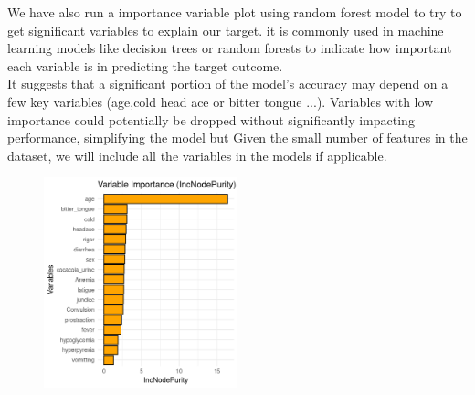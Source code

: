 \documentclass[12pt,a4paper]{article}
\begin{document}
We have also run a importance variable plot using random forest model to try to get significant variables to explain our target. it is commonly used in machine learning models like decision trees or random forests to indicate how important each variable is in predicting the target outcome.\\
It suggests that a significant portion of the model's accuracy may depend on a few key variables (age,cold head ace or bitter tongue ...). Variables with low importance could potentially be dropped without significantly impacting performance, simplifying the model but Given the small number of features in the dataset, we will include all the
variables in the models if applicable.
\begin{figure}[H]
	\centering
	\includegraphics[width=0.5\textwidth, height=0.35\textheight]{Figures/importanceVar.png}
	\label{fig:code}
\end{figure}
\end{document}
